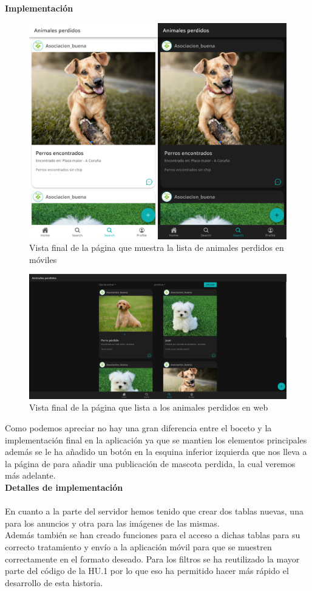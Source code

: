 \textbf{Implementación}
\begin{figure}[H]
	\centering
	\includegraphics[width=0.5\linewidth]{"sprint 2/hu3/disenoFinal"}
	\caption{Vista final de la página que muestra la lista de animales perdidos en móviles}
	\label{fig:listaAdop}
\end{figure}

\begin{figure}[H]
	\centering
	\includegraphics[width=0.8\linewidth]{"sprint 2/hu3/disenoFinalWeb"}
	\caption{Vista final de la página que lista a los animales perdidos en web}
	\label{fig:disenofinalweb}
\end{figure}

Como podemos apreciar no hay una gran diferencia entre el boceto y la implementación final en la aplicación ya que se mantien los elementos principales además se le ha añadido un botón en la esquina inferior izquierda que nos lleva a la página de para añadir una publicación de mascota perdida, la cual veremos más adelante.\\

\textbf{Detalles de implementación} \\ \\
En cuanto a la parte del servidor hemos tenido que crear dos tablas nuevas, una para los anuncios y otra para las imágenes de las mismas.\\

Además también se han creado funciones para el acceso a dichas tablas para su correcto tratamiento y envío a la aplicación móvil para que se muestren correctamente en el formato deseado. Para los filtros se ha reutilizado la mayor parte del código de la HU.1 por lo que eso ha permitido hacer más rápido el desarrollo de esta historia.\\ \\

